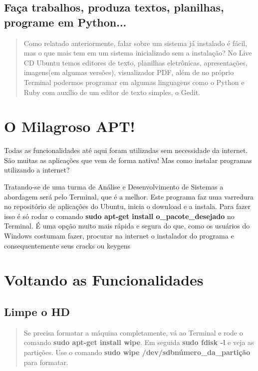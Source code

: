 \documentclass[12pt, a4paper, tocpage=plain]{abnt} %
\begin{document}
\section{Faça trabalhos, produza textos, planilhas, programe em Python...}

\begin{quote}
Como relatado anteriormente, falar sobre um sistema já instalado é fácil, mas o que mais tem em um sistema inicializado sem a instalação? No Live CD Ubuntu temos editores de texto, planilhas eletrônicas, apresentações, imagens(em algumas versões), visualizador PDF, além de no próprio Terminal podermos programar em algumas linguagens como o Python e Ruby com auxílio de um editor de texto simples, o Gedit.
\end{quote}

\chapter{O Milagroso APT!}

Todas as funcionalidades até aqui foram utilizadas sem necessidade da internet. São muitas as aplicações que vem de forma nativa! Mas como instalar programas utilizando a internet?

Tratando-se de uma turma de Análise e Desenvolvimento de Sistemas a abordagem será pelo Terminal, que é a melhor. Este programa faz uma varredura no repositório de aplicações do Ubuntu, inicia o download e a instala. Para fazer isso é só rodar o comando {\bf sudo apt-get install o\_pacote\_desejado} no Terminal. É uma opção muito mais rápida e segura do que, como os usuários do Windows costumam fazer, procurar na internet o instalador do programa e consequentemente seus cracks ou keygens

\chapter{Voltando as Funcionalidades}

\section{Limpe o HD}

\begin{quote}
Se precisa formatar a máquina completamente, vá ao Terminal e rode o comando {\bf sudo apt-get install wipe}. Em seguida {\bf sudo fdisk -l} e veja as partições. Use o comando {\bf sudo wipe /dev/sdbnúmero\_da\_partição} para formatar.
\end{quote}
\end{document}
